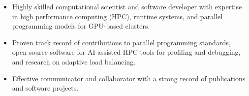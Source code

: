 
\selectfont
\begin{itemize}[itemsep=-0em]
    \item Highly skilled computational scientist and software developer with expertise in high performance computing (HPC), runtime systems, and parallel programming models for GPU-based clusters. 
    \item Proven track record of contributions to parallel programming standards, open-source software for AI-assisted HPC tools for profiling and debugging, and research on adaptive load balancing. 
    \item Effective communicator and collaborator with a strong record of publications and software projects. 
\end{itemize}
